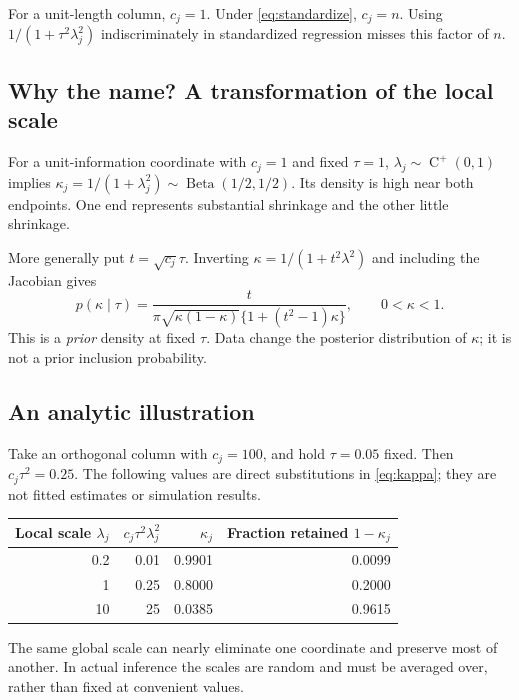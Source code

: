 \documentclass[11pt,letterpaper]{article}
\numberwithin{equation}{section}
\newcommand{\HC}{\operatorname{C}^{+}}
\newcommand{\given}{\mid}
\begin{document}
For a unit-length column, \(c_j=1\). Under \eqref{eq:standardize}, \(c_j=n\).
Using \(1/(1+\tau^2\lambda_j^2)\) indiscriminately in standardized regression
misses this factor of \(n\).

\subsection{Why the name? A transformation of the local scale}

For a unit-information coordinate with \(c_j=1\) and fixed \(\tau=1\),
\(\lambda_j\sim\HC(0,1)\) implies
\(\kappa_j=1/(1+\lambda_j^2)\sim\operatorname{Beta}(1/2,1/2)\).
Its density is high near both endpoints. One end represents substantial
shrinkage and the other little shrinkage.

More generally put \(t=\sqrt{c_j}\tau\). Inverting
\(\kappa=1/(1+t^2\lambda^2)\) and including the Jacobian gives
\begin{equation}\label{eq:kappadensity}
 p(\kappa\given\tau)=
 \frac{t}{\pi\sqrt{\kappa(1-\kappa)}\{1+(t^2-1)\kappa\}},
 \qquad 0<\kappa<1.
\end{equation}
This is a \emph{prior} density at fixed \(\tau\). Data change the posterior
distribution of \(\kappa\); it is not a prior inclusion probability.

\subsection{An analytic illustration}

Take an orthogonal column with \(c_j=100\), and hold \(\tau=0.05\) fixed.
Then \(c_j\tau^2=0.25\). The following values are direct substitutions in
\eqref{eq:kappa}; they are not fitted estimates or simulation results.
\begin{center}
\begin{tabular}{@{}rrrr@{}}
\toprule
Local scale \(\lambda_j\) & \(c_j\tau^2\lambda_j^2\) & \(\kappa_j\) & Fraction retained \(1-\kappa_j\)\\
\midrule
0.2 & 0.01 & 0.9901 & 0.0099\\
1   & 0.25 & 0.8000 & 0.2000\\
10  & 25   & 0.0385 & 0.9615\\
\bottomrule
\end{tabular}
\end{center}
The same global scale can nearly eliminate one coordinate and preserve most
of another. In actual inference the scales are random and must be averaged
over, rather than fixed at convenient values.
\end{document}
